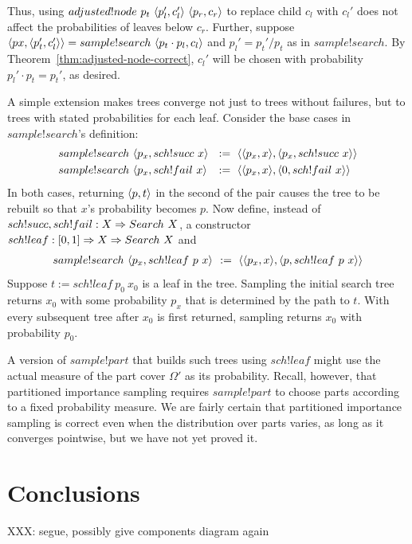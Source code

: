 Thus, using $adjusted!node~p_t~\langle{p_l',c_l'}\rangle~\langle{p_r,c_r}\rangle$ to replace child $c_l$ with $c_l'$ does not affect the probabilities of leaves below $c_r$.
Further, suppose $\langle{px,\langle{p_t',c_l'}\rangle}\rangle = sample!search~\langle{p_t \cdot p_l,c_l}\rangle$ and $p_l' = p_t'{/}p_t$ as in $sample!search$.
By Theorem~\ref{thm:adjusted-node-correct}, $c_l'$ will be chosen with probability $p_l' \cdot p_t = p_t'$, as desired.

A simple extension makes trees converge not just to trees without failures, but to trees with stated probabilities for each leaf.
Consider the base cases in $sample!search$'s definition:
\begin{equation}
\begin{aligned}
	&sample!search~\pair{p_x,sch!succ~x}&&\!\! :=\ \pair{\pair{p_x,x},\pair{p_x,sch!succ~x}} \\
	&sample!search~\pair{p_x,sch!fail~x}&&\!\! :=\ \pair{\pair{p_x,x},\pair{0,sch!fail~x}} \\
\end{aligned}
\end{equation}
In both cases, returning $\langle{p,t}\rangle$ in the second of the pair causes the tree to be rebuilt so that $x$'s probability becomes $p$.
Now define, instead of $sch!succ,sch!fail : X \Rightarrow Search~X$, a constructor $sch!leaf : [0,1] \Rightarrow X \Rightarrow Search~X$ and
\begin{equation}
\begin{aligned}
	sample!search~\pair{p_x,sch!leaf~p~x}&&\!\! :=\ \pair{\pair{p_x,x},\pair{p,sch!leaf~p~x}} \\
\end{aligned}
\end{equation}
Suppose $t := sch!leaf~p_0~x_0$ is a leaf in the tree.
Sampling the initial search tree returns $x_0$ with some probability $p_x$ that is determined by the path to $t$.
With every subsequent tree after $x_0$ is first returned, sampling returns $x_0$ with probability $p_0$.

A version of $sample!part$ that builds such trees using $sch!leaf$ might use the actual measure of the part cover $\Omega'$ as its probability.
Recall, however, that partitioned importance sampling requires $sample!part$ to choose parts according to a fixed probability measure.
We are fairly certain that partitioned importance sampling is correct even when the distribution over parts varies, as long as it converges pointwise, but we have not yet proved it.

\section{Conclusions}

XXX: segue, possibly give components diagram again

